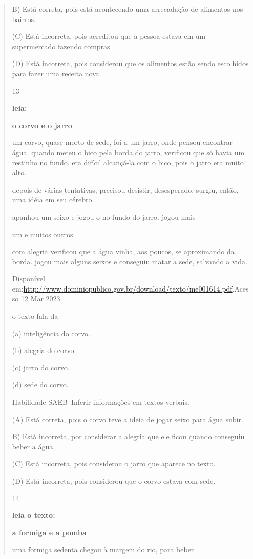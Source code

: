 {{{{\begin{verse}
{{\begin{escolha}
{{{{{B) Está correta, pois está acontecendo uma arrecadação de alimentos nos
bairros.

(C) Está incorreta, pois acreditou que a pessoa estava em um
supermercado fazendo compras.

(D) Está incorreta, pois considerou que os alimentos estão sendo
escolhidos para fazer uma receita nova.

\num{13}

\textbf{leia:}

\textbf{o corvo e o jarro}

um corvo, quase morto de sede, foi a um jarro, onde pensou encontrar
água. quando meteu o bico pela borda do jarro, verificou que só havia um
restinho no fundo. era difícil alcançá-la com o bico, pois o jarro era
muito alto.

depois de várias tentativas, precisou desistir, desesperado. surgiu,
então, uma idéia em seu cérebro.

apanhou um seixo e jogou-o no fundo do jarro. jogou mais

um e muitos outros.

com alegria verificou que a água vinha, aos poucos, se aproximando da
borda. jogou mais alguns seixos e conseguiu matar a sede, salvando a
vida.

Disponível
em:\url{http://www.dominiopublico.gov.br/download/texto/me001614.pdf}.Acesso
12 Mar 2023.

o texto fala da

(a) inteligência do corvo.

(b) alegria do corvo.

(c) jarro do corvo.

(d) sede do corvo.

Habilidade SAEB~Inferir informações em textos verbais.

\protect\hypertarget{_Hlk129586281}{}{}(\protect\hypertarget{_Hlk129420306}{}{}A)
Está correta, pois o corvo teve a ideia de jogar seixo para água subir.

B) Está incorreta, por considerar a alegria que ele ficou quando
conseguiu beber a água.

(C) Está incorreta, pois considerou o jarro que aparece no texto.

(D) Está incorreta, pois considerou que o corvo estava com sede.

\num{14}

\textbf{leia o texto:}

\textbf{a formiga e a pomba}

uma formiga sedenta chegou à margem do rio, para beber

}}}}}
\end{escolha}}}
\end{verse}}}}}

